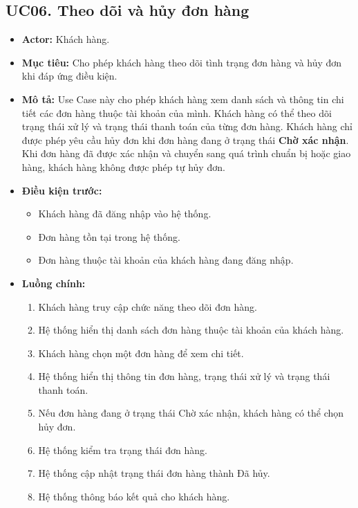 \documentclass[12pt,a4paper]{article}
\begin{document}
\subsection*{UC06. Theo dõi và hủy đơn hàng}

\begin{itemize}

    \item \textbf{Actor:} Khách hàng.

    \item \textbf{Mục tiêu:} Cho phép khách hàng theo dõi tình trạng đơn hàng và hủy đơn khi đáp ứng điều kiện.

    \item \textbf{Mô tả:} Use Case này cho phép khách hàng xem danh sách và thông tin chi tiết các đơn hàng thuộc tài khoản của mình. Khách hàng có thể theo dõi trạng thái xử lý và trạng thái thanh toán của từng đơn hàng. Khách hàng chỉ được phép yêu cầu hủy đơn khi đơn hàng đang ở trạng thái \textbf{Chờ xác nhận}. Khi đơn hàng đã được xác nhận và chuyển sang quá trình chuẩn bị hoặc giao hàng, khách hàng không được phép tự hủy đơn.

    \item \textbf{Điều kiện trước:}
    \begin{itemize}
        \item Khách hàng đã đăng nhập vào hệ thống.
        \item Đơn hàng tồn tại trong hệ thống.
        \item Đơn hàng thuộc tài khoản của khách hàng đang đăng nhập.
    \end{itemize}

    \item \textbf{Luồng chính:}
    \begin{enumerate}
        \item Khách hàng truy cập chức năng theo dõi đơn hàng.
        \item Hệ thống hiển thị danh sách đơn hàng thuộc tài khoản của khách hàng.
        \item Khách hàng chọn một đơn hàng để xem chi tiết.
        \item Hệ thống hiển thị thông tin đơn hàng, trạng thái xử lý và trạng thái thanh toán.
        \item Nếu đơn hàng đang ở trạng thái Chờ xác nhận, khách hàng có thể chọn hủy đơn.
        \item Hệ thống kiểm tra trạng thái đơn hàng.
        \item Hệ thống cập nhật trạng thái đơn hàng thành Đã hủy.
        \item Hệ thống thông báo kết quả cho khách hàng.
    \end{enumerate}


\end{itemize}
\end{document}
